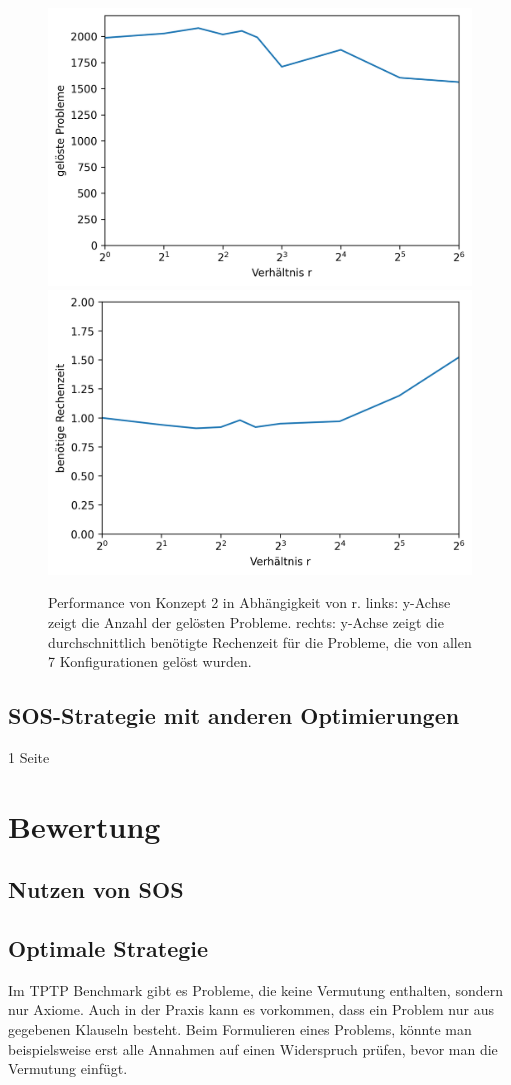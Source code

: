 	\begin{figure}
		\centering
		\includegraphics[width=0.45\linewidth]{images/Diagram/RWert}
		\includegraphics[width=0.45\linewidth]{images/Diagram/RWert2}
		\caption[Performance von Konzept 2 in Abhängigkeit von r]{Performance von Konzept 2 in Abhängigkeit von r. links: y-Achse zeigt die Anzahl der gelösten Probleme. rechts: y-Achse zeigt die durchschnittlich benötigte Rechenzeit für die Probleme, die von allen 7 Konfigurationen gelöst wurden.}
		\label{fig:rwert}
	\end{figure}
	
	
	\subsection{SOS-Strategie mit anderen Optimierungen}
	1 Seite
		
\section{Bewertung}
	\subsection{Nutzen von SOS}
	\subsection{Optimale Strategie}
	Im TPTP Benchmark gibt es Probleme, die keine Vermutung enthalten, sondern nur Axiome. Auch in der Praxis kann es vorkommen, dass ein Problem nur aus gegebenen Klauseln besteht. Beim Formulieren eines Problems, könnte man beispielsweise erst alle Annahmen auf einen Widerspruch prüfen, bevor man die Vermutung einfügt.
	
